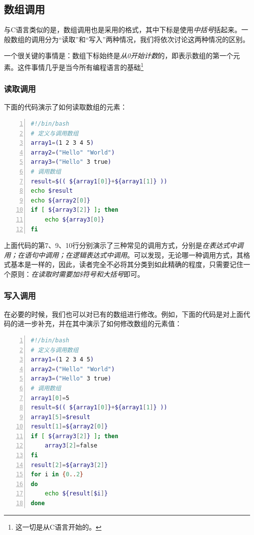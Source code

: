 \subsection{数组调用}\label{subsec:数组-数组调用}

与C语言类似的是，数组调用也是采用的格式，其中下标是使用\emph{中括号}括起来。一般数组的调用分为“读取”和“写入”两种情况，我们将依次讨论这两种情况的区别。

\begin{attention}
    一个很关键的事情是：数组下标始终是\emph{从0开始计数}的，即表示数组的第一个元素。这件事情几乎是当今所有编程语言的基础\footnote{这一切是从C语言开始的。}
\end{attention}

\subsubsection{读取调用}

下面的代码演示了如何读取数组的元素：

\begin{lstlisting}[language=bash,numbers=left,caption={array\_test\_cont1}]
#!/bin/bash
# 定义与调用数组
array1=(1 2 3 4 5)
array2=("Hello" "World")
array3=("Hello" 3 true)
# 调用数组
result=$(( ${array1[0]}+${array1[1]} )) 
echo $result
echo ${array2[0]}
if [ ${array3[2]} ]; then
    echo ${array3[0]}
fi
\end{lstlisting}

上面代码的第7、9、10行分别演示了三种常见的调用方式，分别是\emph{在表达式中调用；在语句中调用；在逻辑表达式中调用}。可以发现，无论哪一种调用方式，其格式基本是一样的，因此，读者完全不必将其分类到如此精确的程度，只需要记住一个原则：\emph{在读取时需要加\$符号和大括号}即可。

\subsubsection{写入调用}

在必要的时候，我们也可以对已有的数组进行修改。例如，下面的代码是对上面代码的进一步补充，并在其中演示了如何修改数组的元素值：

\begin{lstlisting}[language=bash,numbers=left,caption={array\_test\_cont2}]
#!/bin/bash
# 定义与调用数组
array1=(1 2 3 4 5)
array2=("Hello" "World")
array3=("Hello" 3 true)
# 调用数组
array1[0]=5
result=$(( ${array1[0]}+${array1[1]} )) 
array1[5]=$result
result[1]=${array2[0]}
if [ ${array3[2]} ]; then
    array3[2]=false
fi
result[2]=${array3[2]}
for i in {0..2}
do
    echo ${result[$i]}
done
\end{lstlisting}

